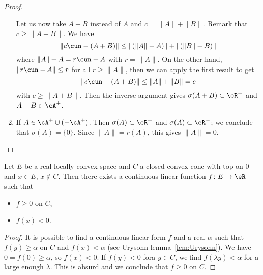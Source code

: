 \begin{proof}
\begin{enumerate}
                Let us now take $A+B$ instead of $A$ and $c=\| A \|+\| B \|$. Remark that $c\geq \| A+B \|$. We have
                \[
                    \| c\cun-(A+B) \|\leq\| (\| A \|-A) \|+\| (\| B \|-B) \|
                \]
                where $\| A \|-A=r\cun-A$ with $r=\| A \|$. On the other hand, $\| r\cun-A \|\leq r$ for all $r\geq\| A \|$, then we can apply the first result to get
                \[
                    \| c\cun-(A+B) \|\leq \| A \|+\| B \|=c
                \]
                with $c\geq \| A+B \|$. Then the inverse argument gives $\sigma(A+B)\subset\eR^+$ and $A+B\in\cA^+$.

            \item

                If $A\in\cA^+\cup (-\cA^+)$. Then $\sigma(A)\subset\eR^+$ and $\sigma(A)\subset\eR^-$; we conclude that $\sigma(A)=\{  0\}$. Since $\| A \|=r(A)$, this gives $\| A \|=0$.

        \end{enumerate}
\end{proof}


\begin{proposition}
Let $E$ be a real locally convex space and $C$ a closed convex cone with top on $0$ and $x\in E$, $x\notin C$. Then there exists a continuous linear function $f\colon E\to \eR$ such that
\begin{itemize}
\item $f\geq 0$ on $C$,
\item $f(x)<0$.
\end{itemize}

\end{proposition}

\begin{proof}
It is possible to find a continuous linear form $f$ and a real $\alpha$ such that $f(y)\geq\alpha$ on $C$ and $f(x)<\alpha$ (see Urysohn lemma~\ref{lem:Urysohn}). We have $0=f(0)\geq\alpha$, so $f(x)<0$. If $f(y)<0$ fora $y\in C$, we find $f(\lambda y)<\alpha$ for a large enough $\lambda$. This is absurd and we conclude that $f\geq0$ on $C$.
\end{proof}
